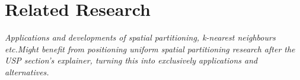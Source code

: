 \section{Related Research\label{sec:related-work}}

  \textit{Applications and developments of spatial partitioning, k-nearest neighbours etc.\newline Might benefit from positioning uniform spatial partitioning research after the USP section's explainer, turning this into exclusively applications and alternatives.}
